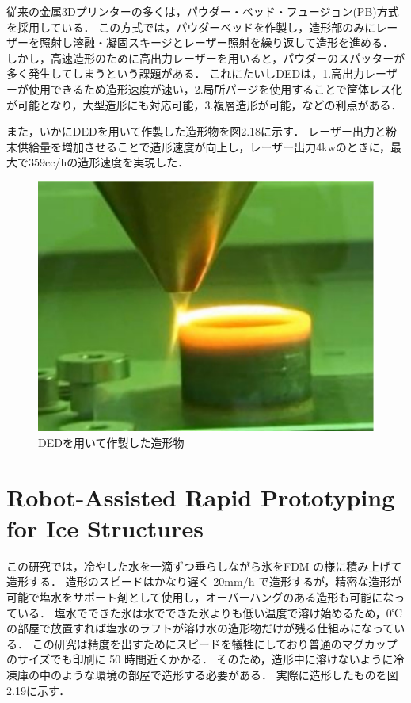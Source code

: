 従来の金属3Dプリンターの多くは，パウダー・ベッド・フュージョン(PB)方式を採用している．
この方式では，パウダーベッドを作製し，造形部のみにレーザーを照射し溶融・凝固スキージとレーザー照射を繰り返して造形を進める．
しかし，高速造形のために高出力レーザーを用いると，パウダーのスパッターが多く発生してしまうという課題がある．
これにたいしDEDは，1.高出力レーザーが使用できるため造形速度が速い，2.局所パージを使用することで筐体レス化が可能となり，大型造形にも対応可能，3.複層造形が可能，などの利点がある．

また，いかにDEDを用いて作製した造形物を図2.18に示す．
レーザー出力と粉末供給量を増加させることで造形速度が向上し，レーザー出力4kwのときに，最大で359cc/hの造形速度を実現した．

\begin{figure}[H]
  \centering
  \includegraphics[width=11truecm]{./fig/kinnzoku2.jpg}
  \caption{DEDを用いて作製した造形物}
  \label{fig:ferret}
\end{figure}



\section{Robot-Assisted Rapid Prototyping for Ice Structures\cite{ss}}
\label{sec:enum}
この研究では，冷やした水を一滴ずつ垂らしながら氷をFDM の様に積み上げて造形する．
造形のスピードはかなり遅く 20mm/h で造形するが，精密な造形が可能で塩水をサポート剤として使用し，オーバーハングのある造形も可能になっている．
塩水でできた氷は水でできた氷よりも低い温度で溶け始めるため，0℃ の部屋で放置すれば塩水のラフトが溶け水の造形物だけが残る仕組みになっている．
この研究は精度を出すためにスピードを犠牲にしており普通のマグカップのサイズでも印刷に 50 時間近くかかる．
そのため，造形中に溶けないように冷凍庫の中のような環境の部屋で造形する必要がある．
実際に造形したものを図2.19に示す．


